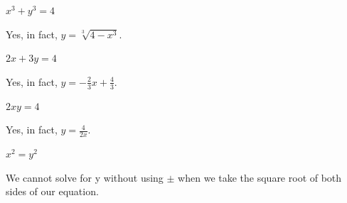 \documentclass{ximera}
\begin{document}
\begin{question}
\begin{problem}
$x^3 + y^3 = 4$
\begin{multipleChoice}
    \begin{feedback}
        Yes, in fact, $y=\sqrt[3]{4-x^3}$.
    \end{feedback}
\end{multipleChoice}
\end{problem}


\begin{problem}
$2x + 3y = 4$
\begin{multipleChoice}
    \begin{feedback}
        Yes, in fact, $y=-\frac{2}{3}x+\frac{4}{3}$.
    \end{feedback}
\end{multipleChoice}
\end{problem}

\begin{problem}
$2xy = 4$
\begin{multipleChoice}
    \begin{feedback}
        Yes, in fact, $y=\frac{4}{2x}$.
    \end{feedback}
\end{multipleChoice}
\end{problem}

\begin{problem}\label{equfunctionlast}
$x^2 = y^2$
\begin{multipleChoice}
    \begin{feedback}
        We cannot solve for y without using $\pm$ when we take the square root of both sides of our equation.
    \end{feedback}
\end{multipleChoice}
\end{problem}

\end{question}
\end{document}
